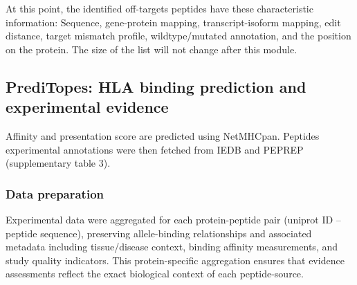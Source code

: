 \documentclass[unnumsec,webpdf,contemporary,large]{oup-authoring-template}%
\theoremstyle{thmstyleone}%
\theoremstyle{thmstyletwo}%
\theoremstyle{thmstylethree}%
\begin{document}
        At this point, the identified off-targets peptides have these characteristic information: Sequence, gene-protein mapping, transcript-isoform mapping, edit distance, target mismatch profile, wildtype/mutated annotation, and the position on the protein. The size of the list will not change after this module. 
        
    \subsection{\textbf{PrediTopes: HLA binding prediction and experimental evidence}}\label{sec:preditipes}
        Affinity and presentation score are predicted using NetMHCpan. Peptides experimental annotations were then fetched from IEDB \cite{vita2019immune} and PEPREP (supplementary table 3). 
        \subsubsection{Data preparation} \label{sec:bayes_data}
            Experimental data were aggregated for each protein-peptide pair (uniprot ID – peptide sequence), preserving allele-binding relationships and associated metadata including tissue/disease context, binding affinity measurements, and study quality indicators. This protein-specific aggregation ensures that evidence assessments reflect the exact biological context of each peptide-source. 
            
\end{document}
